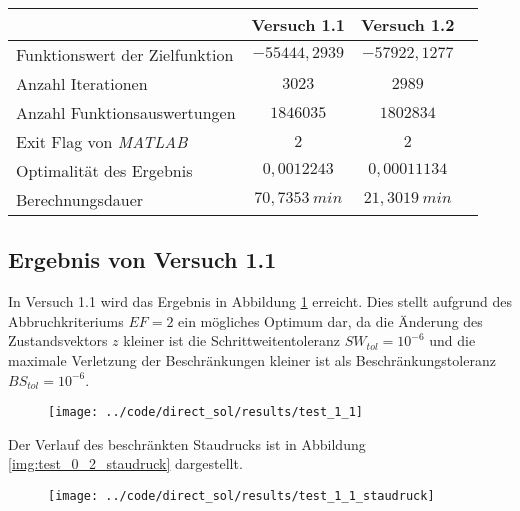 \begin{table}[H]
    \centering
    \label{tab:Versuch1_TA}
    \begin{tabularx}{.9\textwidth}{Zccc}
        \toprule
         & \textbf{Versuch 1.1} & \textbf{Versuch 1.2} \\
        \midrule
        Funktionswert der Zielfunktion & $-55444,2939$ & $-57922,1277$ \\
        Anzahl Iterationen & $3023$ & $2989$ \\
        Anzahl Funktionsauswertungen & $1846035$ & $1802834$ \\
        Exit Flag von \textit{MATLAB} & $2$ & $2$ \\
        Optimalität des Ergebnis & $0,0012243$ & $0,00011134$ \\
        Berechnungsdauer & $70,7353 \ min$ & $21,3019 \ min$ \\
        \bottomrule
    \end{tabularx}
\end{table}




\subsection{Ergebnis von Versuch 1.1}\label{kap:Versuch11}
In Versuch 1.1 wird das Ergebnis in Abbildung \ref{img:test_1_1} erreicht. Dies stellt aufgrund des Abbruchkriteriums $EF = 2$ ein mögliches Optimum dar, da die Änderung des Zustandsvektors $z$ kleiner ist die Schrittweitentoleranz $SW_{tol} = 10^{-6}$ und die maximale Verletzung der Beschränkungen kleiner ist als Beschränkungstoleranz $BS_{tol} = 10^{-6}$.
\begin{figure}[H]
\begin{center}
\texttt{[image: ../code/direct\_sol/results/test\_1\_1]}
 \label{img:test_1_1}
\end{center}
\end{figure}
Der Verlauf des beschränkten Staudrucks ist in Abbildung \ref{img:test_0_2_staudruck} dargestellt.
\begin{figure}[H]
\begin{center}
\texttt{[image: ../code/direct\_sol/results/test\_1\_1\_staudruck]}
 \label{img:test_1_1_staudruck}
\end{center}
\end{figure}




